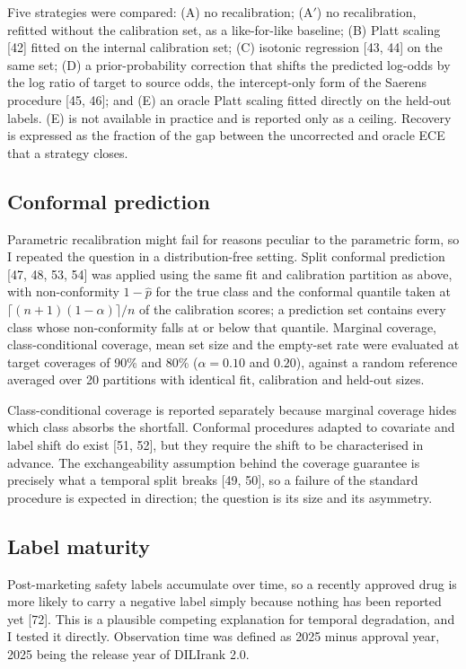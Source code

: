 \documentclass[pdflatex,sn-basic,Numbered,referee,lineno]{sn-jnl}%
\theoremstyle{thmstyleone}%
\theoremstyle{thmstyletwo}%
\theoremstyle{thmstylethree}%
\begin{document}
Five strategies were compared: (A) no recalibration; (A$'$) no recalibration, refitted without the calibration set, as a like-for-like baseline; (B) Platt scaling [42] fitted on the internal calibration set; (C) isotonic regression [43, 44] on the same set; (D) a prior-probability correction that shifts the predicted log-odds by the log ratio of target to source odds, the intercept-only form of the Saerens procedure [45, 46]; and (E) an oracle Platt scaling fitted directly on the held-out labels. (E) is not available in practice and is reported only as a ceiling. Recovery is expressed as the fraction of the gap between the uncorrected and oracle ECE that a strategy closes.

\subsection{Conformal prediction}

Parametric recalibration might fail for reasons peculiar to the parametric form, so I repeated the question in a distribution-free setting. Split conformal prediction [47, 48, 53, 54] was applied using the same fit and calibration partition as above, with non-conformity $1 - \hat{p}$ for the true class and the conformal quantile taken at $\lceil (n+1)(1-\alpha) \rceil / n$ of the calibration scores; a prediction set contains every class whose non-conformity falls at or below that quantile. Marginal coverage, class-conditional coverage, mean set size and the empty-set rate were evaluated at target coverages of 90\% and 80\% ($\alpha = 0.10$ and $0.20$), against a random reference averaged over 20 partitions with identical fit, calibration and held-out sizes.

Class-conditional coverage is reported separately because marginal coverage hides which class absorbs the shortfall. Conformal procedures adapted to covariate and label shift do exist [51, 52], but they require the shift to be characterised in advance. The exchangeability assumption behind the coverage guarantee is precisely what a temporal split breaks [49, 50], so a failure of the standard procedure is expected in direction; the question is its size and its asymmetry.

\subsection{Label maturity}

Post-marketing safety labels accumulate over time, so a recently approved drug is more likely to carry a negative label simply because nothing has been reported yet [72]. This is a plausible competing explanation for temporal degradation, and I tested it directly. Observation time was defined as 2025 minus approval year, 2025 being the release year of DILIrank 2.0.
\end{document}
